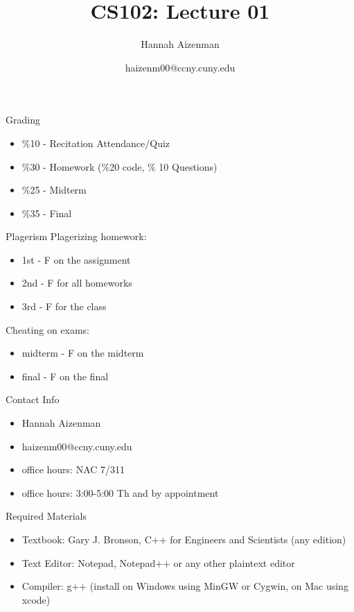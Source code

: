 \documentclass[xcolor={dvipsnames}]{beamer}
\begin{document}
\title{ CS102: Lecture 01}
\author{Hannah Aizenman}
\date{haizenm00@ccny.cuny.edu}


\begin{frame}
	\titlepage
\end{frame}

\begin{frame}{Grading}
	\begin{itemize}
		\item \%10 - Recitation Attendance/Quiz
		\item \%30 - Homework (\%20 code, \% 10 Questions)
		\item \%25 - Midterm
 		\item \%35 - Final
	\end{itemize}
\end{frame}

\begin{frame}{Plagerism}
	Plagerizing homework:
	\begin{itemize}
		\item 1st - F on the assignment
		\item 2nd - F for all homeworks
		\item 3rd - F for the class
	\end{itemize}
	Cheating on exams:
	\begin{itemize}
		\item midterm - F on the midterm
		\item final - F on the final
	\end{itemize}
\end{frame}

\begin{frame}{Contact Info}
\begin{itemize}
	\item Hannah Aizenman
	\item haizenm00@ccny.cuny.edu
	\item office hours: NAC 7/311
	\item office hours: 3:00-5:00 Th and by appointment
\end{itemize}
\end{frame}

\begin{frame}{Required Materials}
\begin{itemize}
	\item Textbook: Gary J. Bronson, C++ for Engineers and Scientists (any edition)
	\item Text Editor: Notepad, Notepad++ or any other plaintext editor
	\item Compiler: g++ (install on Windows using MinGW or Cygwin, on Mac using xcode)
\end{itemize}
\end{frame}
\end{document}

